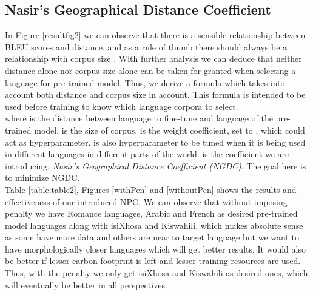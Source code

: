 \documentclass[11pt]{article}
\begin{document}
\subsection{Nasir's Geographical Distance Coefficient}

In Figure \ref{resultfig2} we can observe that there is a sensible relationship between BLEU scores and distance, and as a rule of thumb there should always be a relationship with corpus size \citep{lin2019choosing}. With further analysis we can deduce that neither distance alone nor corpus size alone can be taken for granted when selecting a language for pre-trained model. Thus, we derive a formula which takes into account both distance and corpus size in account. This formula is intended to be used before training to know which language corpora to select.
\\





where  is the distance between language to fine-tune and language of the pre-trained model,  is the size of corpus,  is the weight coefficient, set to , which could act as hyperparameter.  is also hyperparameter to be tuned when it is being used in different languages in different parts of the world.  is the coefficient we are introducing, \emph{Nasir's Geographical Distance Coefficient (NGDC)}. The goal here is to minimize NGDC. \\



Table \ref{table:table2}, Figures \ref{withPen} and \ref{withoutPen} shows the results and effectiveness of our introduced NPC. We can observe that without imposing penalty we have Romance languages, Arabic and French as desired pre-trained model languages along with isiXhosa and Kiswahili, which makes absolute sense as some have more data and others are near to target language but we want to have morphologically closer languages which will get better results. It would also be better if lesser carbon footprint is left and lesser training resources are used. Thus, with the penalty we only get isiXhosa and Kiswahili as desired ones, which will eventually be better in all perspectives. 
\end{document}
